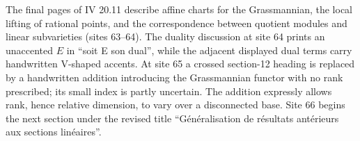 \documentclass[10pt,a4paper]{article}
\begin{document}
\par{}
The final pages of IV 20.11 describe affine charts for the Grassmannian, the local lifting of rational points, and the correspondence between quotient modules and linear subvarieties (sites 63--64). The duality discussion at site 64 prints an unaccented $E$ in ``soit E son dual'', while the adjacent displayed dual terms carry handwritten V-shaped accents. At site 65 a crossed section-12 heading is replaced by a handwritten addition introducing the Grassmannian functor with no rank prescribed; its small index is partly uncertain. The addition expressly allows rank, hence relative dimension, to vary over a disconnected base. Site 66 begins the next section under the revised title ``Généralisation de résultats antérieurs aux sections linéaires''.
\par{}

\par{}
\end{document}
